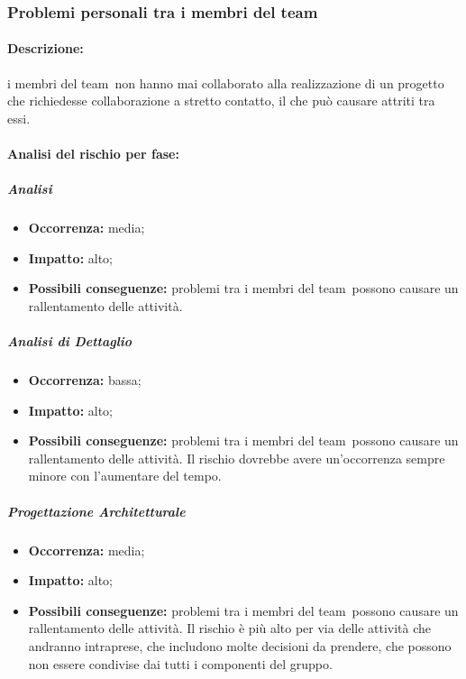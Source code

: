 \documentclass[../PianoProgetto.tex]{subfiles}
\begin{document}
\newpage
\subsubsection{Problemi personali tra i membri del team}
\label{sec:Problemi personali tra i membri del team}

	\paragraph*{Descrizione:} i membri del team\g\ non hanno mai collaborato alla realizzazione di un progetto che richiedesse collaborazione a stretto contatto, il che può causare attriti tra essi.
	
	\paragraph*{Analisi del rischio per fase:} 

		\subparagraph*{Analisi}
			\begin{itemize}[label={-}]
				\item \textbf{Occorrenza:} media;
				\item \textbf{Impatto:} alto;
				\item \textbf{Possibili conseguenze:} problemi tra i membri del team\g\ possono causare un rallentamento delle attività.
			\end{itemize}
			
		\subparagraph*{Analisi di Dettaglio}
			\begin{itemize}[label={-}]
				\item \textbf{Occorrenza:} bassa;
				\item \textbf{Impatto:} alto;
				\item \textbf{Possibili conseguenze:} problemi tra i membri del team\g\ possono causare un rallentamento delle attività. Il rischio dovrebbe avere un'occorrenza sempre minore con l'aumentare del tempo.
			\end{itemize}
			
		\subparagraph*{Progettazione Architetturale}
			\begin{itemize}[label={-}]
				\item \textbf{Occorrenza:} media;
				\item \textbf{Impatto:} alto;
				\item \textbf{Possibili conseguenze:} problemi tra i membri del team\g\ possono causare un rallentamento delle attività. Il rischio è più alto per via delle attività che andranno intraprese, che includono molte decisioni da prendere, che possono non essere condivise dai tutti i componenti del gruppo. 
			\end{itemize}
			
\end{document}
